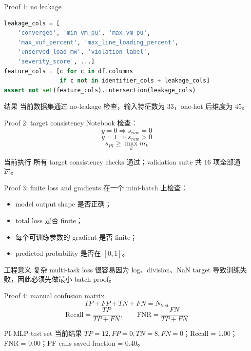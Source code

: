 \documentclass[aspectratio=169,11pt]{beamer}
\begin{document}
\begin{frame}[fragile]{Proof 1: no leakage}
\begin{lstlisting}[language=Python]
leakage_cols = [
    'converged', 'min_vm_pu', 'max_vm_pu',
    'max_vuf_percent', 'max_line_loading_percent',
    'unserved_load_mw', 'violation_label',
    'severity_score', ...]
feature_cols = [c for c in df.columns
                if c not in identifier_cols + leakage_cols]
assert not set(feature_cols).intersection(leakage_cols)
\end{lstlisting}
\begin{block}{结果}
当前数据集通过 no-leakage 检查，输入特征数为 33，one-hot 后维度为 45。
\end{block}
\end{frame}

\begin{frame}{Proof 2: target consistency}
Notebook 检查：
\[
y=0 \Rightarrow s_{raw}=0
\]
\[
y=1 \Rightarrow s_{raw}>0
\]
\[
s_{PI}\ge \max_k m_k
\]
\begin{block}{当前执行}
所有 target consistency checks 通过；validation suite 共 16 项全部通过。
\end{block}
\end{frame}

\begin{frame}{Proof 3: finite loss and gradients}
在一个 mini-batch 上检查：
\begin{itemize}
  \item model output shape 是否正确；
  \item total loss 是否 finite；
  \item 每个可训练参数的 gradient 是否 finite；
  \item predicted probability 是否在 $[0,1]$。
\end{itemize}
\begin{alertblock}{工程意义}
复杂 multi-task loss 很容易因为 log、division、NaN target 导致训练失败，因此必须先做最小 batch proof。
\end{alertblock}
\end{frame}

\begin{frame}{Proof 4: manual confusion matrix}
\[
TP+FP+TN+FN=N_{test}
\]
\[
\mathrm{Recall}=\frac{TP}{TP+FN},\qquad \mathrm{FNR}=\frac{FN}{TP+FN}
\]
\begin{block}{PI-MLP test set 当前结果}
$TP=12, FP=0, TN=8, FN=0$；Recall = 1.00；FNR = 0.00；PF calls saved fraction = 0.40。
\end{block}
\end{frame}
\end{document}
